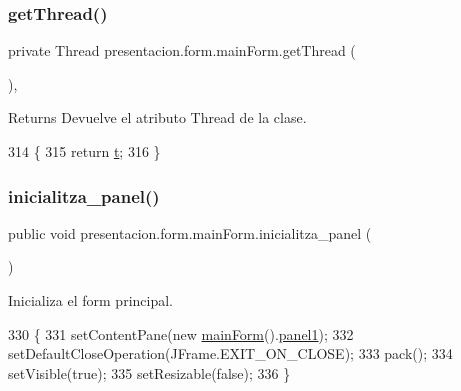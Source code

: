 \subsubsection{\texorpdfstring{get\+Thread()}{getThread()}}
{\footnotesize\ttfamily private Thread presentacion.\+form.\+main\+Form.\+get\+Thread (\begin{DoxyParamCaption}{ }\end{DoxyParamCaption})\hspace{0.3cm}{\ttfamily [inline]}, {\ttfamily [private]}}

\begin{DoxyReturn}{Returns}
Devuelve el atributo Thread de la clase. 
\end{DoxyReturn}

\begin{DoxyCode}
314                                \{
315         \textcolor{keywordflow}{return} \hyperlink{classpresentacion_1_1form_1_1mainForm_a4643a7a227b8b65874d63d33a5adfc33}{t};
316     \}
\end{DoxyCode}
\mbox{\label{classpresentacion_1_1form_1_1mainForm_aae4c847b58c5d50945fa1dd27d534319}} 
\subsubsection{\texorpdfstring{inicialitza\+\_\+panel()}{inicialitza\_panel()}}
{\footnotesize\ttfamily public void presentacion.\+form.\+main\+Form.\+inicialitza\+\_\+panel (\begin{DoxyParamCaption}{ }\end{DoxyParamCaption})\hspace{0.3cm}{\ttfamily [inline]}}



Inicializa el form principal. 


\begin{DoxyCode}
330                                     \{
331         setContentPane(\textcolor{keyword}{new} \hyperlink{classpresentacion_1_1form_1_1mainForm_ac1236f4bc250bf2f5a4a01a072e77555}{mainForm}().\hyperlink{classpresentacion_1_1form_1_1mainForm_aa43e009cc6dc09d4e637385fbd361510}{panel1});
332         setDefaultCloseOperation(JFrame.EXIT\_ON\_CLOSE);
333         pack();
334         setVisible(\textcolor{keyword}{true});
335         setResizable(\textcolor{keyword}{false});
336     \}
\end{DoxyCode}
\mbox{\label{classpresentacion_1_1form_1_1mainForm_a6eb9e9b4f7bb6da2c592a5a0294a6a06}} 
